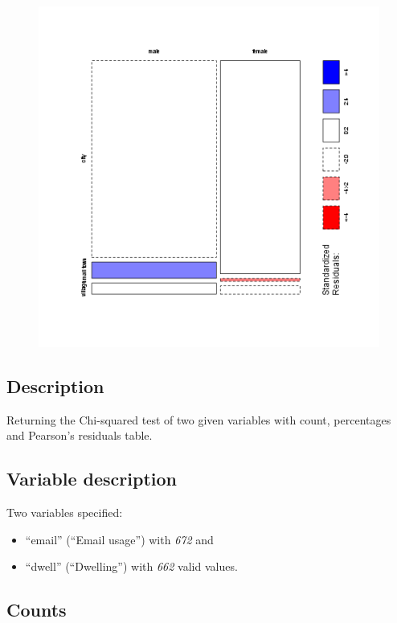 \documentclass[]{article}
\makeatletter
\def\maxwidth{\ifdim\Gin@nat@width>\linewidth\linewidth
\else\Gin@nat@width\fi}
\let\Oldincludegraphics\includegraphics
\renewcommand{\includegraphics}[1]{\Oldincludegraphics[width=\maxwidth]{#1}}
\makeatother
\begin{document}
\begin{figure}[htbp]
\centering
\includegraphics{089332282780d32b96117afe8dba0470.png}
\caption{}
\end{figure}

\subsection{Description}

Returning the Chi-squared test of two given variables with count,
percentages and Pearson's residuals table.

\subsection{Variable description}

Two variables specified:

\begin{itemize}
\item
  ``email'' (``Email usage'') with \emph{672} and
\item
  ``dwell'' (``Dwelling'') with \emph{662} valid values.
\end{itemize}
\subsection{Counts}
\end{document}
